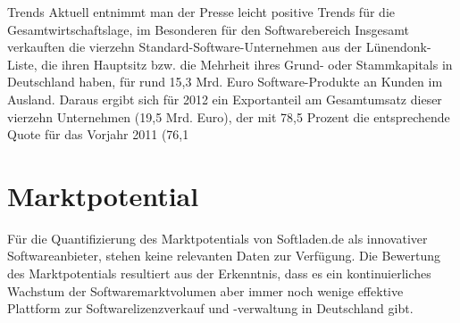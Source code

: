 Trends
Aktuell entnimmt man der Presse leicht positive Trends für die Gesamtwirtschaftslage, im Besonderen für den Softwarebereich Insgesamt verkauften die vierzehn Standard-Software-Unternehmen aus der Lünendonk\textsuperscript{\textregistered}-Liste, die ihren Hauptsitz bzw. die Mehrheit ihres Grund- oder Stammkapitals in Deutschland haben, für rund 15,3 Mrd. Euro Software-Produkte an Kunden im Ausland. Daraus ergibt sich für 2012 ein Exportanteil am Gesamtumsatz dieser vierzehn Unternehmen (19,5 Mrd. Euro), der mit 78,5 Prozent die entsprechende Quote für das Vorjahr 2011 (76,1%

\section{Marktpotential}
Für die Quantifizierung des Marktpotentials von Softladen.de als innovativer Softwareanbieter, stehen keine relevanten Daten zur Verfügung. Die Bewertung des Marktpotentials resultiert aus der Erkenntnis, dass es ein kontinuierliches Wachstum der  Softwaremarktvolumen aber immer noch wenige effektive Plattform zur Softwarelizenzverkauf und -verwaltung in Deutschland gibt.


